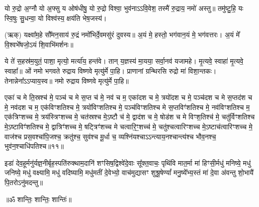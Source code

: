 

यो रु॒द्रो अ॒ग्नौ यो अ॒फ्सु य ओष॑धीषु॒ यो रु॒द्रो विश्वा॒ भुव॑नाऽऽवि॒वेश॒ तस्मै॑ रु॒द्राय॒ नमो॑ अस्तु॥ तमु॑ष्टु॒हि॒ यः स्वि॒षुः सु॒धन्वा॒ यो विश्व॑स्य॒ क्षय॑ति भेष॒जस्य॑।

(ऋक्) यक्ष्वा᳚म॒हे सौ᳚मन॒साय॑ रु॒द्रं नमो᳚भिर्दे॒वमसु॑रं दुवस्य॥ अ॒यं मे॒ हस्तो॒ भग॑वान॒यं मे॒ भग॑वत्तरः। अ॒यं मे᳚ वि॒श्वभे᳚षजो॒ऽयं शि॒वाभि॑मर्शनः॥

ये ते॑ स॒हस्र॑म॒युतं॒ पाशा॒ मृत्यो॒ मर्त्या॑य॒ हन्त॑वे। तान् य॒ज्ञस्य॑ मा॒यया॒ सर्वा॒नव॑ यजामहे। मृ॒त्यवे॒ स्वाहा॑ मृ॒त्यवे॒ स्वाहा᳚॥ ओं नमो भगवते रुद्राय विष्णवे मृत्यु॑र्मे पा॒हि। प्राणानां ग्रन्थिरसि रुद्रो मा॑ विशा॒न्तकः। तेनान्नेना᳚\-ऽऽप्याय॒स्व॥ नमो रुद्राय विष्णवे मृत्यु॑र्मे पा॒हि॥

एका॑ च मे ति॒स्रश्च॑ मे॒ पञ्च॑ च मे स॒प्त च॑ मे॒ नव॑ च म॒ एका॑दश च मे॒ त्रयो॑दश च मे॒ पञ्च॑दश च मे स॒प्तद॑श च मे॒ नव॑दश च म॒ एक॑विꣳशतिश्च मे॒ त्रयो॑विꣳशतिश्च मे॒ पञ्च॑विꣳशतिश्च मे स॒प्तविꣳ॑शतिश्च मे॒ नव॑विꣳशतिश्च म॒ एक॑त्रिꣳशच्च मे॒ त्रय॑स्त्रिꣳशच्च मे॒ चत॑स्रश्च मे॒ऽष्टौ च॑ मे॒ द्वाद॑श च मे॒ षोड॑श च मे विꣳश॒तिश्च॑ मे॒ चतु॑र्विꣳशतिश्च मे॒ऽष्टाविꣳ॑शतिश्च मे॒ द्वात्रिꣳ॑शच्च मे॒ षट्त्रिꣳ॑शच्च मे चत्वारि॒ꣳ॒शच्च॑ मे॒ चतु॑श्चत्वारिꣳशच्च मे॒ऽष्टाच॑त्वारिꣳशच्च मे॒ वाज॑श्च प्रस॒वश्चा॑पि॒जश्च॒ क्रतु॑श्च॒ सुव॑श्च मू॒र्धा च॒ व्यश्नि॑यश्चा\-ऽऽन्त्याय॒नश्चान्त्य॑श्च भौव॒नश्च॒ भुव॑न॒श्चाधि॑पतिश्च॥११॥


\lbrack इडा॑ देव॒हूर्मनु॑र्यज्ञ॒नीर्बृह॒स्पति॑रुक्थाम॒दानि॑ शꣳसिष॒द्विश्वे॑\-दे॒वाः सू᳚क्त॒वाचः॒ पृथि॑वि मात॒र्मा मा॑ हिꣳसी॒र्मधु॑ मनिष्ये॒ मधु॑ जनिष्ये॒ मधु॑ वक्ष्यामि॒ मधु॑ वदिष्यामि॒ मधु॑मतीं दे॒वेभ्यो॒ वाच॑मुद्यासꣳ शुश्रू॒षेण्यां᳚ मनु॒ष्ये᳚भ्य॒स्तं मा॑ दे॒वा अ॑वन्तु शो॒भायै॑ पि॒तरोऽनु॑मदन्तु॥\rbrack

\centerline{॥ॐ शान्तिः॒ शान्तिः॒ शान्तिः॑॥}

{\small\closesection}
